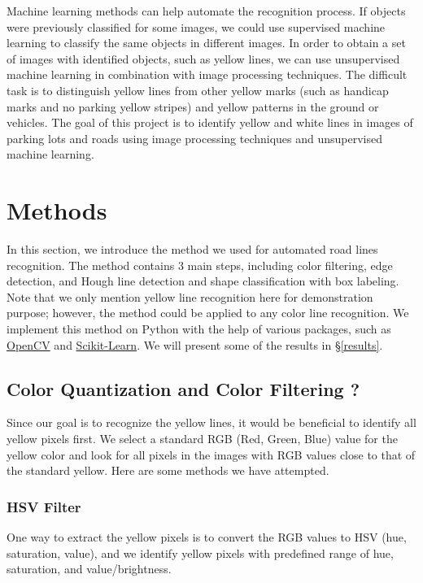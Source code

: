 \documentclass{m2pi}
\begin{document}
Machine learning methods can help automate the recognition process. If objects were previously classified for some images, we could use supervised machine learning to classify the same objects in different images. In order to obtain a set of images with identified objects, such as yellow lines, we can use unsupervised machine learning in combination with image processing techniques. The difficult task is to distinguish yellow lines from other yellow marks (such as handicap marks and no parking yellow stripes) and yellow patterns in the ground or vehicles. The goal of this project is to identify yellow and white lines in images of parking lots and roads using image processing techniques and unsupervised machine learning.

\section{Methods}\label{methods}
In this section, we introduce the method we used for automated 
road lines recognition. The method contains 3 main steps, including
color filtering, edge detection, and Hough line detection and 
shape classification with box labeling. 
Note that we only mention yellow line recognition here for
demonstration purpose; however, the method could be applied 
to any color line recognition. 
We implement this method on Python with the help of various 
packages, such as \href{https://opencv.org/}{OpenCV} and 
\href{https://scikit-learn.org/stable/}{Scikit-Learn}.
We will present some of the results in \S \ref{results}.



\subsection{{\color{red} Color Quantization and Color Filtering ?}}


Since our goal is to recognize the yellow lines, it would be beneficial to identify all yellow pixels first. We select a standard RGB (Red, Green, Blue) value for the yellow color and look for all pixels in the images with RGB values close to that of the standard yellow. Here are some methods we have attempted.

\subsubsection{HSV  Filter}

One way to extract the yellow pixels is to convert the RGB values to HSV (hue, saturation, value), and we identify yellow pixels with predefined range of hue, saturation, and value/brightness.
\end{document}
